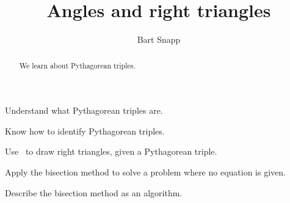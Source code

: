 \documentclass[noauthor,nooutcomes,handout]{ximera}
\title{Angles and right triangles}
\author{Bart Snapp}
\begin{document}
\begin{abstract}
  We learn about Pythagorean triples.
\end{abstract}
\maketitle

\begin{listOutcomes}
\item{Understand what Pythagorean triples are.}
\item{Know how to identify Pythagorean triples.}
\item{Use \snap\ to draw right triangles, given a Pythagorean triple.}
\item{Apply the bisection method to solve a problem where no equation is given.}
\item{Describe the bisection method as an algorithm.}
\end{listOutcomes}
\mynewpage
\end{document}
